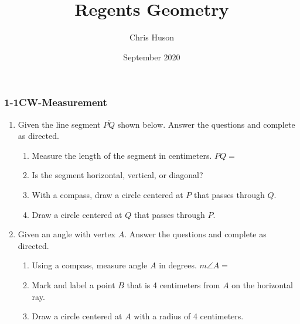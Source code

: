 \documentclass[12pt, twoside]{article}
\title{Regents Geometry}
\author{Chris Huson}
\date{September 2020}
\begin{document}
\subsubsection*{1-1CW-Measurement}
\begin{enumerate}
\item Given the line segment $\overline{PQ}$ shown below. Answer the questions and complete as directed.
    \begin{enumerate}
      \item Measure the length of the segment in centimeters. $PQ=$
      \bigskip
      \item Is the segment horizontal, vertical, or diagonal?
      \bigskip
      \item With a compass, draw a circle centered at $P$ that passes through $Q$.
      \bigskip
      \item Draw a circle centered at $Q$ that passes through $P$.
    \end{enumerate}
    \vspace{7cm}
    \begin{center}
    \end{center}
  
\newpage

\item Given an angle with vertex $A$. Answer the questions and complete as directed.
    \begin{enumerate}
      \item Using a compass, measure angle $A$ in degrees. $m\angle A =$
      \bigskip
      \item Mark and label a point $B$ that is 4 centimeters from $A$ on the horizontal ray.
      \bigskip
      \item Draw a circle centered at $A$ with a radius of 4 centimeters. \bigskip
    \end{enumerate}
    \vspace{3cm}
    \begin{center}
    \end{center}


\end{enumerate}
\end{document}
